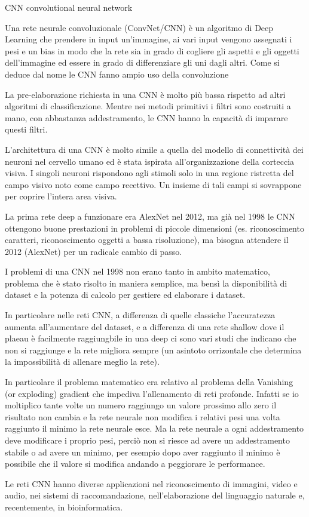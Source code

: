 \makeglossaries

 {CNN} {convolutional neural network}
{
    Una rete neurale convoluzionale (ConvNet/CNN) è un algoritmo di Deep Learning che prendere in input un'immagine, ai vari input vengono assegnati i pesi e un bias in modo che la rete sia in grado di cogliere gli aspetti e gli oggetti dell'immagine ed essere in grado di differenziare gli uni dagli altri. Come si deduce dal nome le CNN fanno ampio uso della \gls{convoluzione}

    La pre-elaborazione richiesta in una CNN è molto più bassa rispetto ad altri algoritmi di classificazione. Mentre nei metodi primitivi i filtri sono costruiti a mano, con abbastanza addestramento, le CNN hanno la capacità di imparare questi filtri.

    L'architettura di una CNN è molto simile a quella del modello di connettività dei neuroni nel cervello umano ed è stata ispirata all'organizzazione della corteccia visiva. I singoli neuroni rispondono agli stimoli solo in una regione ristretta del campo visivo noto come campo recettivo. Un insieme di tali campi si sovrappone per coprire l'intera area visiva.

    La prima rete deep a funzionare era AlexNet nel 2012, ma già nel 1998 le CNN ottengono buone prestazioni in problemi di
    piccole dimensioni (es. riconoscimento caratteri, riconoscimento
    oggetti a bassa risoluzione), ma bisogna attendere il 2012
    (AlexNet) per un radicale cambio di passo.

    I problemi di una CNN nel 1998 non erano tanto in ambito matematico, problema che è stato risolto in maniera semplice, ma bensì la disponibilità di dataset e la potenza di calcolo per gestiere ed elaborare i dataset.

    In particolare nelle reti CNN, a differenza di quelle classiche l'accuratezza aumenta all'aumentare del dataset, e a differenza di una rete shallow dove il  plaeau è facilmente raggiungbile in una deep ci sono vari studi che indicano che non si raggiunge e la rete migliora sempre    (un asintoto orrizontale che determina la impossibilità di allenare meglio la rete).

    In particolare il problema matematico era relativo al problema della Vanishing (or exploding) gradient che impediva l'allenamento di reti profonde. Infatti se io moltiplico tante volte un numero raggiungo un valore prossimo allo zero il risultato non cambia e la rete neurale non modifica i relativi pesi una volta raggiunto il minimo la rete neurale esce. Ma la rete neurale a ogni addestramento deve modificare i proprio pesi,  perciò non si riesce ad avere un addestramento stabile o ad avere un minimo, per esempio dopo aver raggiunto il minimo  è possibile che il valore si modifica andando a peggiorare le performance.

    Le reti CNN hanno diverse applicazioni nel riconoscimento di immagini,  video e audio, nei sistemi di raccomandazione, nell’elaborazione del
    linguaggio naturale e, recentemente, in bioinformatica.
}

